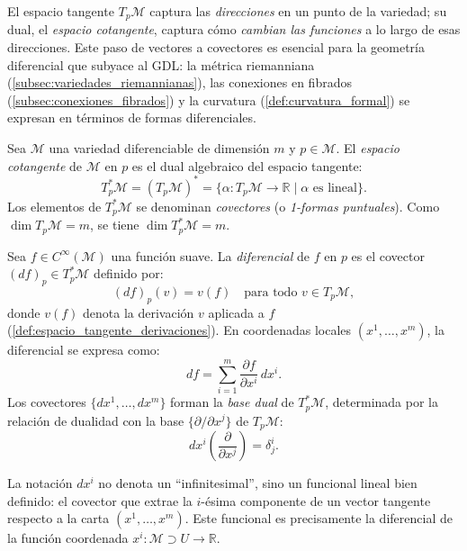 El espacio tangente $T_p\mathcal{M}$ captura las \textit{direcciones} en un punto de la variedad; su dual, el \textit{espacio cotangente}, captura cómo \textit{cambian las funciones} a lo largo de esas direcciones. Este paso de vectores a covectores es esencial para la geometría diferencial que subyace al \gls{GDL}: la métrica riemanniana (\autoref{subsec:variedades_riemannianas}), las conexiones en fibrados (\autoref{subsec:conexiones_fibrados}) y la curvatura (\autoref{def:curvatura_formal}) se expresan en términos de formas diferenciales.

\begin{definition}\label{def:espacio_cotangente}
Sea $\mathcal{M}$ una variedad diferenciable de dimensión $m$ y $p \in \mathcal{M}$. El \textit{espacio cotangente} de $\mathcal{M}$ en $p$ es el dual algebraico del espacio tangente:
\[
T_p^*\mathcal{M} = (T_p\mathcal{M})^* = \{\alpha: T_p\mathcal{M} \to \mathbb{R} \mid \alpha \text{ es lineal}\}.
\]
Los elementos de $T_p^*\mathcal{M}$ se denominan \textit{covectores} (o \textit{1-formas puntuales}). Como $\dim T_p\mathcal{M} = m$, se tiene $\dim T_p^*\mathcal{M} = m$.
\end{definition}

\begin{definition}\label{def:diferencial_funcion}
Sea $f \in C^\infty(\mathcal{M})$ una función suave. La \textit{diferencial} de $f$ en $p$ es el covector $(df)_p \in T_p^*\mathcal{M}$ definido por:
\[
(df)_p(v) = v(f) \quad \text{para todo } v \in T_p\mathcal{M},
\]
donde $v(f)$ denota la derivación $v$ aplicada a $f$ (\autoref{def:espacio_tangente_derivaciones}). En coordenadas locales $(x^1, \ldots, x^m)$, la diferencial se expresa como:
\[
df = \sum_{i=1}^m \frac{\partial f}{\partial x^i} \, dx^i.
\]
Los covectores $\{dx^1, \ldots, dx^m\}$ forman la \textit{base dual} de $T_p^*\mathcal{M}$, determinada por la relación de dualidad con la base $\{\partial/\partial x^j\}$ de $T_p\mathcal{M}$:
\[
dx^i\!\left(\frac{\partial}{\partial x^j}\right) = \delta^i_j.
\]
\end{definition}

\begin{remark}\label{rem:notacion_base_dual}
La notación $dx^i$ no denota un ``infinitesimal'', sino un funcional lineal bien definido: el covector que extrae la $i$-ésima componente de un vector tangente respecto a la carta $(x^1, \ldots, x^m)$. Este funcional es precisamente la diferencial de la función coordenada $x^i: \mathcal{M} \supset U \to \mathbb{R}$.
\end{remark}

